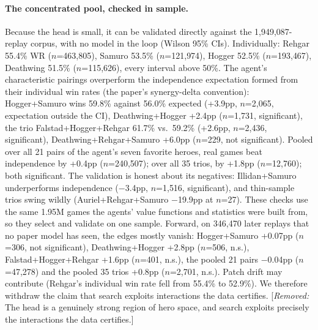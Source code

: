 \documentclass[journal]{IEEEtran}
\newcommand{\added}[1]{{\color{blue}#1}}
\newcommand{\removed}[1]{{\color{red}[\textit{Removed:} #1]}}
\newcommand{\added}[1]{#1}
\newcommand{\removed}[1]{}
\begin{document}
\paragraph{\added{The concentrated pool, checked in sample.}} Because the head is small, it can be validated directly against the 1,949,087-replay corpus, with no model in the loop (Wilson 95\% CIs). Individually: Rehgar 55.4\% WR ($n$=463{,}805), Samuro 53.5\% ($n$=121{,}974), Hogger 52.5\% ($n$=193{,}467), Deathwing 51.5\% ($n$=115{,}626), every interval above 50\%. The agent's characteristic pairings overperform the independence expectation formed from their individual win rates (the paper's synergy-delta convention): Hogger+Samuro wins 59.8\% against 56.0\% expected (+3.9pp, $n$=2{,}065, expectation outside the CI), Deathwing+Hogger +2.4pp ($n$=1{,}731, significant), the trio Falstad+Hogger+Rehgar 61.7\% vs.\ 59.2\% (+2.6pp, $n$=2{,}436, significant), Deathwing+Rehgar+Samuro +6.0pp ($n$=229, not significant). Pooled over all 21 pairs of the agent's seven favorite heroes, real games beat independence by +0.4pp ($n$=240{,}507); over all 35 trios, by +1.8pp ($n$=12{,}760); both significant. The validation is honest about its negatives: Illidan+Samuro underperforms independence ($-$3.4pp, $n$=1{,}516, significant), and thin-sample trios swing wildly (Auriel+Rehgar+Samuro $-$19.9pp at $n$=27). \added{These checks use the same 1.95M games the agents' value functions and statistics were built from, so they select and validate on one sample. Forward, on 346,470 later replays that no paper model has seen, the edges mostly vanish: Hogger+Samuro +0.07pp ($n$=306, not significant), Deathwing+Hogger +2.8pp ($n$=506, n.s.), Falstad+Hogger+Rehgar +1.6pp ($n$=401, n.s.), the pooled 21 pairs $-$0.04pp ($n$=47{,}278) and the pooled 35 trios +0.8pp ($n$=2{,}701, n.s.). Patch drift may contribute (Rehgar's individual win rate fell from 55.4\% to 52.9\%). We therefore withdraw the claim that search exploits interactions the data certifies.} \removed{The head is a genuinely strong region of hero space, and search exploits precisely the interactions the data certifies.}
\end{document}

